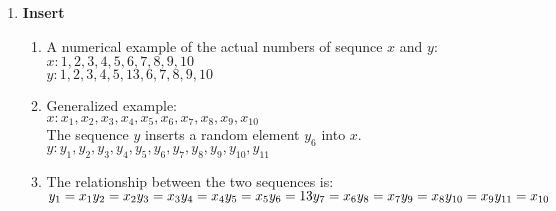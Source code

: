 \documentclass[letterpaper, 24pt, final, onecolumn, titlepage] {article}
\begin{document}
\begin {enumerate}
\begin{enumerate}
				Each Element of $y$ can  be written i terms of $x$:\\
			       $y_1=x_1\\
				 y_2=x_2\\
				 y_3=x_3\\
				...\\
				y_{k-1}=x_{k-1}\\
				y_k=x_{k+1}\\
				..\\
			 	 y_{n-1}=x_{n}\\
				 y_n=x_{n+1}$\\
 				 A general expression to represent this relationship for $n$ elements is:\\
				\[
					y_i=
					\begin{cases}
  						x_i & \text{if}\ i=0,1,2,...,k-1 \\
 					 	x_{i+1}           & \text{if}\ i=k,...,n
					\end{cases}
				\]
		\end{enumerate}
	\item \textbf{Insert}
		\begin{enumerate}
			\item A numerical example of the actual numbers of sequnce $x$ and $y$:\\
				$x:1,2,3,4,5,6,7,8,9,10$\\
				$y:1,2,3,4,5,13,6,7,8,9,10$\\
			\item Generalized example:\\
				$x:x_1,x_2,x_3,x_4,x_5,x_6,x_7,x_8,x_9,x_{10}$\\
				The sequence $y$ inserts a random element $y_6$ into $x$.\\
				$y:y_1,y_2,y_3,y_4,y_5,y_6,y_7,y_8,y_9,y_{10},y_{11}$\\
			\item The relationship between the two sequences is:\\
				 $y_1=x_1\\
				 y_2=x_2\\
				 y_3=x_3\\
			 	 y_4=x_4\\
				 y_5=x_5\\
				 y_6=13\\
				 y_7=x_6\\
			 	 y_8=x_7\\
				 y_9=x_8\\
				 y_{10}=x_9\\
				 y_{11}=x_{10}$\\

\end{enumerate}
\end{enumerate}
\end{document}
